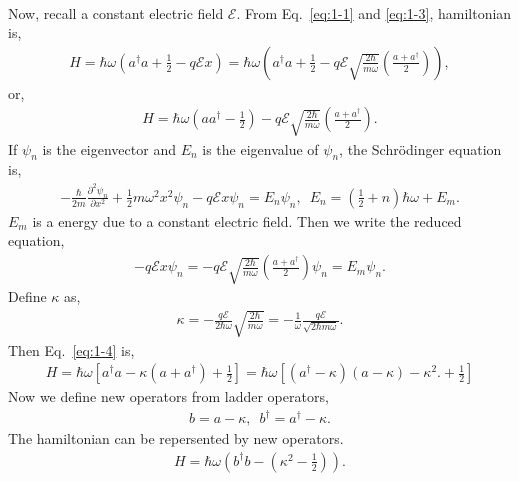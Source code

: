 \documentclass[floatfix,nofootinbib,superscriptaddress,fleqn]{revtex4-2}
\begin{document}
\begin{itemize}
\begin{align}
  \end{align}
  Now, recall a constant electric field $\mathcal{E}$. From Eq.~\eqref{eq:1-1}
   and \eqref{eq:1-3}, hamiltonian is,
   \begin{align}
    H = \hbar\omega\left(a^\dagger a + \frac{1}{2}-q\mathcal{E}x\right)
    = \hbar\omega\left(a^\dagger a + \frac{1}{2}-q\mathcal{E}
    \sqrt{\frac{2\hbar}{m\omega}}\left(\frac{a+a^\dagger}{2}\right)\right),
   \end{align}  
   or,
   \begin{align}\label{eq:1-4}
    H = \hbar\omega\left(a a^\dagger - \frac{1}{2}\right)
    -q\mathcal{E}\sqrt{\frac{2\hbar}{m\omega}}
    \left(\frac{a+a^\dagger}{2}\right).
   \end{align}
   If $\psi_n$ is the eigenvector and $E_n$ is the eigenvalue of $\psi_n$, 
   the Schr\"odinger equation is,
   \begin{align}
    -\frac{\hbar}{2m}\frac{\partial^2\psi_n}{\partial x^2}
    +\frac{1}{2}m\omega^2x^2\psi_n
    -q\mathcal{E}x\psi_n = E_n\psi_n,\,\,\, 
    E_n = \left(\frac{1}{2}+n\right)\hbar\omega+E_m.
   \end{align}
   $E_m$ is a energy due to a constant electric field. Then we write the 
   reduced equation,
   \begin{align}\label{eq:1-5}
    -q\mathcal{E}x\psi_n = -q\mathcal{E}\sqrt{\frac{2\hbar}{m\omega}}
    \left(\frac{a+a^\dagger}{2}\right)\psi_n = E_m\psi_n.
   \end{align}
   Define $\kappa$ as,
   \begin{align}
     \kappa = -\frac{q\mathcal{E}}{2\hbar\omega}\sqrt{\frac{2\hbar}{m\omega}}
     = -\frac{1}{\omega}\frac{q\mathcal{E}}{\sqrt{2\hbar m\omega}}.
   \end{align}
   Then Eq.~\eqref{eq:1-4} is,
   \begin{align}
     H = \hbar\omega\left[a^\dagger a-\kappa\left(a+a^\dagger\right)
     +\frac{1}{2}\right]
     = \hbar\omega\left[(a^\dagger - \kappa)(a - \kappa) -\kappa^2.
     +\frac{1}{2}\right]
   \end{align}
   Now we define new operators from ladder operators,
   \begin{align}
     b = a - \kappa,\,\,\,
     b^\dagger = a^\dagger - \kappa.
   \end{align}
   The hamiltonian can be repersented by new operators.
   \begin{align}
     H = \hbar\omega\left( b^\dagger b -\left(\kappa^2-\frac{1}{2}\right)\right).
   \end{align}

\end{itemize}
\end{document}
